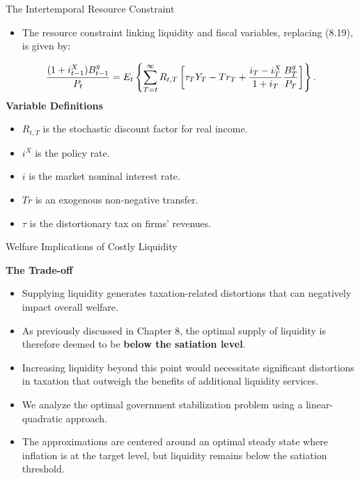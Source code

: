 \documentclass[11pt,aspectratio=169]{beamer}
\begin{document}
\begin{frame}{The Intertemporal Resource Constraint}
\small

\begin{itemize}
    \item The resource constraint linking liquidity and fiscal variables, replacing (8.19), is given by:
\end{itemize}
\footnotesize
\begin{equation}
\frac{(1+i_{t-1}^{X})B_{t-1}^{g}}{P_{t}}=E_{t}\left\{ \sum_{T=t}^{\infty
}R_{t,T}\left[ \tau _{T}Y_{T}-Tr_{T}+\frac{i_{T}-i_{T}^{X}}{1+i_{T}}\frac{%
B_{T}^{g}}{P_{T}}\right] \right\}.  \label{IBCGbis}
\end{equation}
\vspace{0.2cm}
\small
\textbf{Variable Definitions}
\begin{itemize}
    \item $R_{t,T}$ is the stochastic discount factor for real income.
    \item $i^X$ is the policy rate.
    \item $i$ is the market nominal interest rate.
    \item $Tr$ is an exogenous non-negative transfer.
    \item $\tau$ is the distortionary tax on firms' revenues.
\end{itemize}
\end{frame}
\begin{frame}{Welfare Implications of Costly Liquidity}
\small

\textbf{The Trade-off}
\begin{itemize}
    \item Supplying liquidity generates taxation-related distortions that can negatively impact overall welfare.
    \item As previously discussed in Chapter 8, the optimal supply of liquidity is therefore deemed to be \textbf{below the satiation level}.
    \item Increasing liquidity beyond this point would necessitate significant distortions in taxation that outweigh the benefits of additional liquidity services.
    \item We analyze the optimal government stabilization problem using a linear-quadratic approach.
    \item The approximations are centered around an optimal steady state where inflation is at the target level, but liquidity remains below the satiation threshold.
\end{itemize}
\end{frame}
\end{document}
